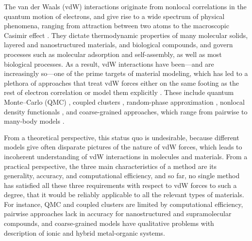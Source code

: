 

The van der Waals (vdW) interactions originate from nonlocal correlations in the quantum motion of electrons, and give rise to a wide spectrum of physical phenomena, ranging from attraction between two atoms \citep{LondonZP30} to the macroscopic Casimir effect \citep{JaffePRD05}.
They dictate thermodynamic properties of many molecular solids, layered and nanostructured materials, and biological compounds, and govern processes such as molecular adsorption and self-assembly, as well as most biological processes.
As a result, vdW interactions have been---and are increasingly so---one of the prime targets of material modeling, which has led to a plethora of approaches that treat vdW forces either on the same footing as the rest of electron correlation or model them explicitly \citep{KlimesJCP12,GrimmeCR16,HermannCR17}.
These include quantum Monte--Carlo (QMC) \citealp{AmbrosettiJPCL14}, coupled clusters \citep{YangS14}, random-phase approximation \citep{LuPRL09}, nonlocal density functionals \citep{DionPRL04,VydrovPRL09}, and coarse-grained approaches, which range from pairwise \citep{GrimmeJCC04,BeckeJCP07,TkatchenkoPRL09} to many-body models \citep{TkatchenkoPRL12,SilvestrelliJCP13}.

From a theoretical perspective, this status quo is undesirable, because different models give often disparate pictures of the nature of vdW forces, which leads to incoherent understanding of vdW interactions in molecules and materials.
From a practical perspective, the three main characteristics of a method are its generality, accuracy, and computational efficiency, and so far, no single method has satisfied all these three requirements with respect to vdW forces to such a degree, that it would be reliably applicable to all the relevant types of materials.
For instance, QMC and coupled clusters are limited by computational efficiency, pairwise approaches lack in accuracy for nanostructured and supramolecular compounds, and coarse-grained models have qualitative problems with description of ionic and hybrid metal-organic systems.


